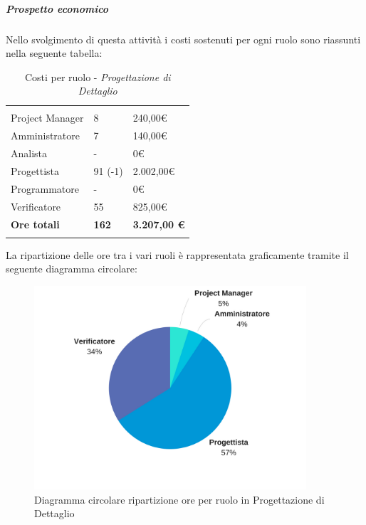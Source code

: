 \subparagraph{Prospetto economico} \Spazio
Nello svolgimento di questa attività i costi sostenuti per ogni ruolo sono riassunti nella seguente tabella:
\begin{table}[H]
	\centering
	\begin{tabular}{|p{4cm}|C{4cm}|C{4cm}|}
		
		 & &\\
		Project Manager & 8 & 240,00\euro \\
		\hline
		Amministratore& 7 & 140,00\euro \\
		\hline
		Analista & - & 0\euro \\
		\hline
		Progettista & 91 (-1) & 2.002,00\euro \\
		\hline
		Programmatore & - & 0\euro \\
		\hline
		Verificatore & 55 & 825,00\euro \\
		\hline
		\textbf{Ore totali} & \textbf{162} & \textbf{3.207,00 \euro} \\
	\end{tabular}
	\caption{Costi per ruolo - \textit{Progettazione di Dettaglio}}
\end{table}

La ripartizione delle ore tra i vari ruoli è rappresentata graficamente tramite il seguente diagramma circolare:

\begin{figure}[H] 
	\centering 
	\includegraphics[width=0.9\textwidth]{images/CircolareProgettazioneDiDettaglioNuova.png} 
	\caption{Diagramma circolare ripartizione ore per ruolo in Progettazione di Dettaglio}
	\label{CircolareProgettazioneDiDettaglio}
\end{figure}


